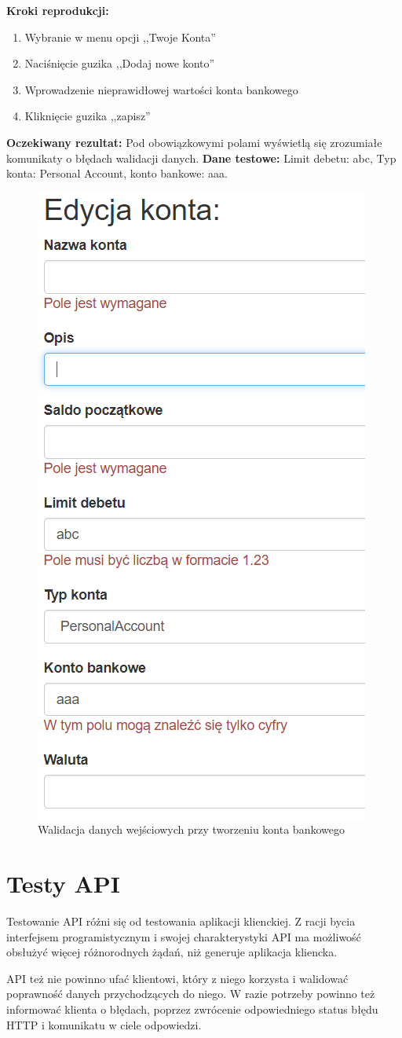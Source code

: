 \begin{enumerate}[labelwidth=1em,label=\Roman*]
    \textbf{Kroki reprodukcji:}  \begin{enumerate}[label=\arabic*.]
        \item Wybranie w menu opcji ,,Twoje Konta''
        \item Naciśnięcie guzika ,,Dodaj nowe konto''
        \item Wprowadzenie nieprawidłowej wartości konta bankowego
        \item Kliknięcie guzika ,,zapisz''
    \end{enumerate}
    \textbf{Oczekiwany rezultat:}  Pod obowiązkowymi polami wyświetlą się zrozumiałe komunikaty o błędach walidacji danych. \newline
    \textbf{Dane testowe:} Limit debetu: abc, Typ konta: Personal Account, konto bankowe: aaa. 
\end{enumerate}

\begin{figure}[t]
	\centering
	\includegraphics[width=.35\linewidth]{rys05/validation-client-1.PNG}
	\caption{Walidacja danych wejściowych przy tworzeniu konta bankowego}
	\label{fig:client-test-1}
\end{figure}

\section{Testy API}
\label{sec:test-api}

Testowanie API różni się od testowania aplikacji klienckiej. Z racji bycia interfejsem programistycznym i swojej charakterystyki API ma możliwość obsłużyć więcej różnorodnych żądań, niż generuje aplikacja kliencka. 

API też nie powinno ufać klientowi, który z niego korzysta i walidować poprawność danych przychodzących do niego. W razie potrzeby powinno też informować klienta o błędach, poprzez zwrócenie odpowiedniego status błędu HTTP i komunikatu w ciele odpowiedzi.

